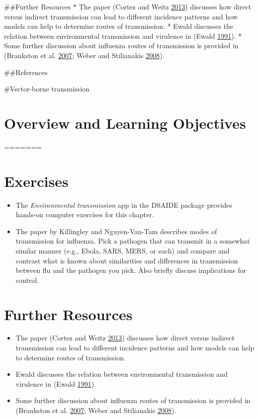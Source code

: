 \documentclass[]{book}
\providecommand{\tightlist}{%
  \setlength{\itemsep}{0pt}\setlength{\parskip}{0pt}}
\theoremstyle{definition}
\theoremstyle{definition}
\theoremstyle{definition}
\theoremstyle{remark}
\begin{document}
\#\#Further Resources * The paper (Cortez and Weitz
\protect\hyperlink{ref-cortez13}{2013}) discusses how direct versus
indirect transmission can lead to different incidence patterns and how
models can help to determine routes of transmission. * Ewald discusses
the relation between environmental transmission and virulence in (Ewald
\protect\hyperlink{ref-ewald91}{1991}). * Some further discussion about
influenza routes of transmission is provided in (Brankston et al.
\protect\hyperlink{ref-brankston07}{2007}; Weber and Stilianakis
\protect\hyperlink{ref-weber08}{2008}).

\#\#References

\#Vector-borne transmission

\hypertarget{overview-and-learning-objectives-7}{%
\section{Overview and Learning
Objectives}\label{overview-and-learning-objectives-7}}
=======
\section{Exercises}\label{exercises-6}

\begin{itemize}
\tightlist
\item
  The \emph{Environmental transmission} app in the DSAIDE package
  provides hands-on computer exercises for this chapter.
\item
  The paper by Killingley and Nguyen-Van-Tam describes modes of
  transmission for influenza. Pick a pathogen that can transmit in a
  somewhat similar manner (e.g., Ebola, SARS, MERS, or such) and compare
  and contrast what is known about similarities and differences in
  transmission between flu and the pathogen you pick. Also briefly
  discuss implications for control.
\end{itemize}

\section{Further Resources}\label{further-resources-6}

\begin{itemize}
\tightlist
\item
  The paper (Cortez and Weitz \protect\hyperlink{ref-cortez13}{2013})
  discusses how direct versus indirect transmission can lead to
  different incidence patterns and how models can help to determine
  routes of transmission.
\item
  Ewald discusses the relation between environmental transmission and
  virulence in (Ewald \protect\hyperlink{ref-ewald91}{1991}).
\item
  Some further discussion about influenza routes of transmission is
  provided in (Brankston et al.
  \protect\hyperlink{ref-brankston07}{2007}; Weber and Stilianakis
  \protect\hyperlink{ref-weber08}{2008}).
\end{itemize}
\end{document}
